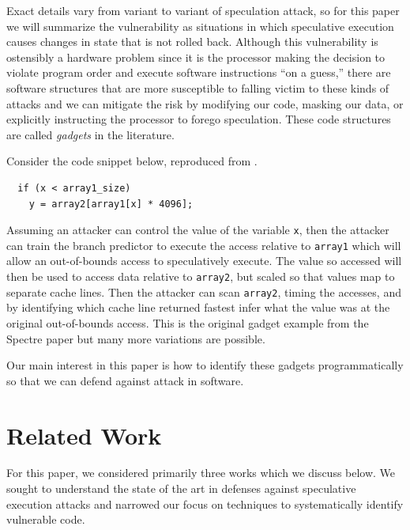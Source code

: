 \documentclass[11pt,conference]{IEEEtran}
\begin{document}
Exact details vary from variant to variant of speculation attack, so for this paper we will summarize the vulnerability as situations in which speculative execution causes changes in state that is not rolled back.
Although this vulnerability is ostensibly a hardware problem since it is the processor making the decision to violate program order and execute software instructions ``on a guess,'' there are software structures that are more susceptible to falling victim to these kinds of attacks and we can mitigate the risk by modifying our code, masking our data, or explicitly instructing the processor to forego speculation.
These code structures are called \emph{gadgets} in the literature.

Consider the code snippet below, reproduced from \cite{spectre}.
\begin{lstlisting}
  if (x < array1_size)
    y = array2[array1[x] * 4096];
\end{lstlisting}
Assuming an attacker can control the value of the variable \texttt{x}, then the attacker can train the branch predictor to execute the access relative to \texttt{array1} which will allow an out-of-bounds access to speculatively execute.
The value so accessed will then be used to access data relative to \texttt{array2}, but scaled so that values map to separate cache lines.
Then the attacker can scan \texttt{array2}, timing the accesses, and by identifying which cache line returned fastest infer what the value was at the original out-of-bounds access.
This is the original gadget example from the Spectre paper but many more variations are possible.

Our main interest in this paper is how to identify these gadgets programmatically so that we can defend against attack in software.



\section{Related Work}\label{sec:related}
For this paper, we considered primarily three works which we discuss below.
We sought to understand the state of the art in defenses against speculative execution attacks and narrowed our focus on techniques to systematically identify vulnerable code.
\end{document}
